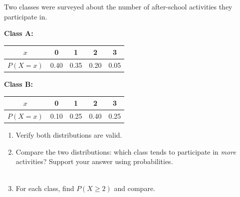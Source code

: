 \documentclass[10pt]{article}
\begin{document}
\vspace{0.12in}

\begin{tcolorbox}[colback=greenbg!60, colframe=greenacc, title=\textbf{Tier E --- Extension},
    arc=2mm, boxrule=0.8pt, left=4mm, right=4mm, top=3mm, bottom=3mm]
\small
Two classes were surveyed about the number of after-school activities they participate in.

\textbf{Class A:}
\begin{center}
\renewcommand{\arraystretch}{1.3}
\begin{tabular}{@{}ccccc@{}}
$x$ & 0 & 1 & 2 & 3 \\
\hline
$P(X=x)$ & 0.40 & 0.35 & 0.20 & 0.05 \\
\end{tabular}
\end{center}

\textbf{Class B:}
\begin{center}
\renewcommand{\arraystretch}{1.3}
\begin{tabular}{@{}ccccc@{}}
$x$ & 0 & 1 & 2 & 3 \\
\hline
$P(X=x)$ & 0.10 & 0.25 & 0.40 & 0.25 \\
\end{tabular}
\end{center}

\begin{enumerate}[leftmargin=1.5em, itemsep=8pt]
  \item Verify both distributions are valid.

        \noindent\begin{minipage}[t][0.2in][t]{\linewidth}\end{minipage}

  \item Compare the two distributions: which class tends to participate in \emph{more}
        activities? Support your answer using probabilities.\\
        \\[1pt]

  \item For each class, find $P(X \ge 2)$ and compare.

        \noindent\begin{minipage}[t][0.25in][t]{\linewidth}\end{minipage}


\end{enumerate}
\end{tcolorbox}
\end{document}
